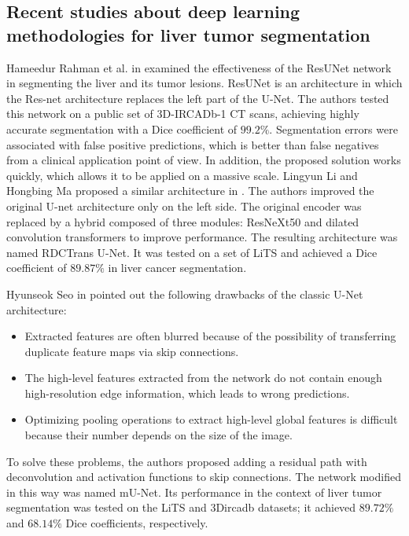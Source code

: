 \subsection{Recent studies about deep learning methodologies for liver tumor segmentation}
\label{recent_studies}
Hameedur Rahman et al. in \cite{rahman_deep_2022} examined the effectiveness of the ResUNet network in segmenting the liver and its tumor lesions. ResUNet is an architecture in which the Res-net architecture replaces the left part of the U-Net. The authors tested this network on a public set of 3D-IRCADb-1 CT scans, achieving highly accurate segmentation with a Dice coefficient of $99.2\%$. Segmentation errors were associated with false positive predictions, which is better than false negatives from a clinical application point of view. In addition, the proposed solution works quickly, which allows it to be applied on a massive scale.
\label{ref:state_of_art}
Lingyun Li and Hongbing Ma proposed a similar architecture in \cite{li_rdctrans_2022}. The authors improved the original U-net architecture only on the left side. The original encoder was replaced by a hybrid composed of three modules: ResNeXt50 and dilated convolution transformers to improve performance. The resulting architecture was named RDCTrans U-Net. It was tested on a set of LiTS and achieved a Dice coefficient of $89.87\%$ in liver cancer segmentation.


Hyunseok Seo in \cite{seo_modified_2020} pointed out the following drawbacks of the classic U-Net architecture:
\begin{itemize}

    \item Extracted features are often blurred because of the possibility of transferring duplicate feature maps via skip connections.
    \item The high-level features extracted from the network do not contain enough high-resolution edge information, which leads to wrong predictions.
    \item Optimizing pooling operations to extract high-level global features is difficult because their number depends on the size of the image.
\end{itemize}
To solve these problems, the authors proposed adding a residual path with deconvolution and activation functions to skip connections. The network modified in this way was named mU-Net. Its performance in the context of liver tumor segmentation was tested on the LiTS and 3Dircadb datasets; it achieved $89.72\%$ and $68.14\%$ Dice coefficients, respectively.

